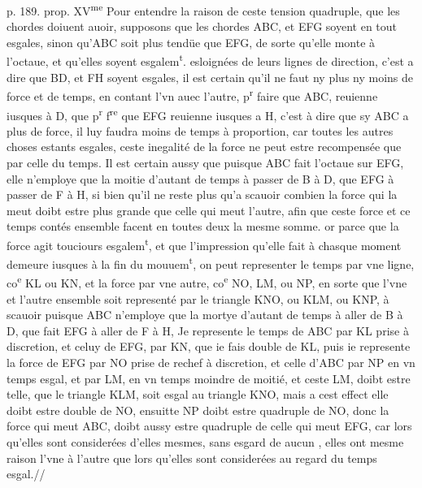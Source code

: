 \documentclass[11pt,a4paper]{article}
\begin{document}
p. 189. prop. XV\textsuperscript{me}
Pour entendre la raison de ceste tension quadruple, que les chordes doiuent auoir, supposons que les chordes ABC, et EFG soyent en tout esgales, sinon qu'ABC soit plus tendüe que EFG, de sorte qu'elle monte à l'octaue, et qu'elles soyent esgalem\textsuperscript{t}. esloignées de leurs lignes de direction, c'est a dire que BD, et FH soyent esgales, il est certain qu'il ne faut ny plus ny moins de force et de temps, en contant l'vn auec l'autre, p\textsuperscript{r} faire que ABC, reuienne iusques à D, que p\textsuperscript{r} f\textsuperscript{re} que EFG reuienne iusques  a H, c'est à dire que sy ABC a plus de force, il luy faudra moins de temps à proportion, car toutes les autres choses estants esgales, ceste inegalité de la force ne peut estre recompensée que par celle du temps. Il est certain aussy que puisque ABC fait l'octaue sur EFG, elle n'employe que la moitie d'autant de temps à passer de B à D, que EFG à passer de F à H, si bien qu'il ne reste plus qu'a scauoir combien la force qui la meut doibt estre plus grande que celle qui meut l'autre, afin que ceste force et ce temps contés ensemble facent en toutes deux la mesme somme. or parce que la force agit touciours esgalem\textsuperscript{t}, et que l'impression qu'elle fait à chasque moment demeure iusques à la fin du mouuem\textsuperscript{t}, on peut representer le temps par vne ligne, co\textsuperscript{e} KL ou KN, et la force par vne autre, co\textsuperscript{e} NO, LM, ou NP, en sorte que l'vne et l'autre ensemble soit representé par le triangle KNO, ou KLM, ou KNP, à scauoir puisque ABC n'employe que la mortye d'autant de temps à aller de B à D, que fait EFG à aller de F à H, Je represente le temps de ABC par KL prise à discretion, et celuy de EFG, par KN, que ie fais double de KL, puis ie represente la force de EFG par NO prise de rechef à discretion, et celle d'ABC par NP en vn temps esgal, et par LM, en vn temps moindre de moitié, et ceste LM, doibt estre telle, que le triangle KLM, soit esgal au triangle KNO, mais a cest effect elle doibt estre double de NO, ensuitte NP doibt estre quadruple de NO, donc la force qui meut ABC, doibt aussy estre quadruple de celle qui meut EFG, car lors qu'elles sont considerées d'elles mesmes, sans esgard de aucun , elles ont mesme raison l'vne à l'autre que lors qu'elles sont considerées au regard du temps esgal.//
\end{document}
